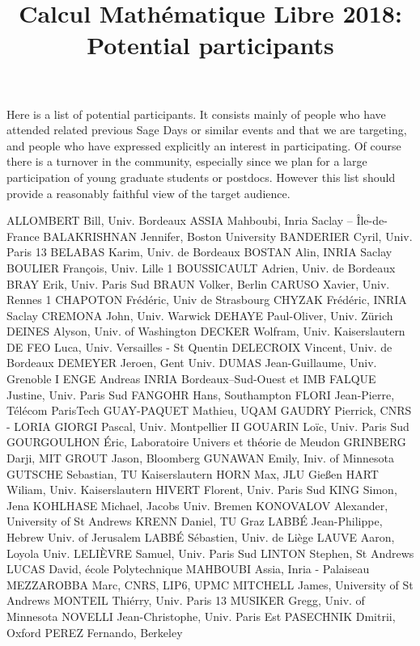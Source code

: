 \documentclass[12pt]{amsart}
\title{Calcul Mathématique Libre 2018:\\Potential participants}
\date{}
\begin{document}
\maketitle
\thispagestyle{empty}

Here is a list of potential participants. It consists mainly of people
who have attended related previous Sage Days or similar events and
that we are targeting, and people who have expressed explicitly an
interest in participating. Of course there is a turnover in the
community, especially since we plan for a large participation of young
graduate students or postdocs. However this list should provide a
reasonably faithful view of the target audience.

\bigskip

\obeylines
ALLOMBERT Bill, Univ. Bordeaux
ASSIA Mahboubi, Inria Saclay -- Île-de-France
BALAKRISHNAN Jennifer, Boston University 
BANDERIER Cyril, Univ. Paris 13
BELABAS Karim, Univ. de Bordeaux
BOSTAN Alin, INRIA Saclay
BOULIER François, Univ. Lille 1
BOUSSICAULT Adrien, Univ. de Bordeaux
BRAY Erik, Univ. Paris Sud
BRAUN Volker, Berlin
CARUSO Xavier, Univ. Rennes 1
CHAPOTON Frédéric, Univ de Strasbourg
CHYZAK Frédéric, INRIA Saclay
CREMONA John, Univ. Warwick
DEHAYE Paul-Oliver, Univ. Zürich
DEINES Alyson, Univ. of Washington
DECKER Wolfram, Univ. Kaiserslautern
DE FEO Luca, Univ. Versailles - St Quentin
DELECROIX Vincent, Univ. de Bordeaux
DEMEYER Jeroen, Gent Univ.
DUMAS Jean-Guillaume, Univ. Grenoble I
ENGE Andreas INRIA Bordeaux–Sud-Ouest et IMB
FALQUE Justine, Univ. Paris Sud
FANGOHR Hans, Southampton
FLORI Jean-Pierre, Télécom ParisTech
GUAY-PAQUET Mathieu, UQAM
GAUDRY Pierrick, CNRS - LORIA
GIORGI Pascal, Univ. Montpellier II
GOUARIN Loïc, Univ. Paris Sud
GOURGOULHON Éric, Laboratoire Univers et théorie de Meudon
GRINBERG Darji, MIT
GROUT Jason, Bloomberg
GUNAWAN Emily, Iniv. of Minnesota
GUTSCHE Sebastian, TU Kaiserslautern
HORN Max, JLU Gießen
HART Wiliam, Univ. Kaiserslautern
HIVERT Florent, Univ. Paris Sud
KING Simon, Jena
KOHLHASE Michael, Jacobs Univ. Bremen
KONOVALOV Alexander, University of St Andrews
KRENN Daniel, TU Graz
LABBÉ Jean-Philippe, Hebrew Univ. of Jerusalem
LABBÉ Sébastien, Univ. de Liège
LAUVE Aaron, Loyola Univ.
LELIÈVRE Samuel, Univ. Paris Sud
LINTON Stephen, St Andrews
LUCAS David, école Polytechnique
MAHBOUBI Assia, Inria - Palaiseau
MEZZAROBBA Marc, CNRS, LIP6, UPMC
MITCHELL James, University of St Andrews
MONTEIL Thiérry, Univ. Paris 13
MUSIKER Gregg, Univ. of Minnesota
NOVELLI Jean-Christophe, Univ. Paris Est
PASECHNIK Dmitrii, Oxford
PEREZ Fernando, Berkeley
\end{document}
